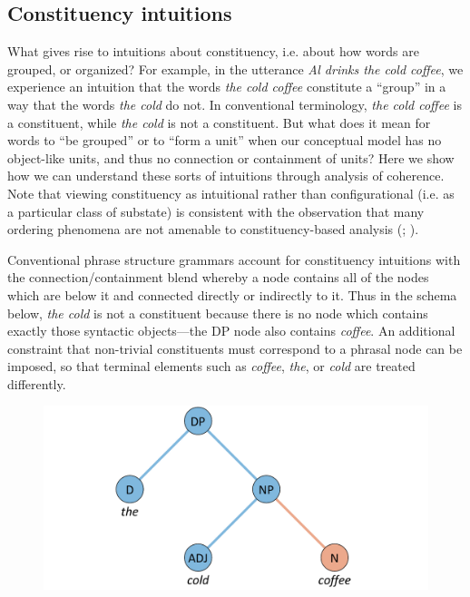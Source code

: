 \subsection{Constituency intuitions}

What gives rise to intuitions about constituency, i.e. about how words are grouped, or organized? For example, in the utterance \textit{Al drinks the cold coffee}, we experience an intuition that the words \textit{the cold coffee} constitute a “group” in a way that the words \textit{the cold} do not. In conventional terminology, \textit{the cold coffee} is a constituent, while \textit{the cold} is not a constituent. But what does it mean for words to “be grouped” or to “form a unit” when our conceptual model has no object-like units, and thus no connection or containment of units? Here we show how we can understand these sorts of intuitions through analysis of coherence. Note that viewing constituency as intuitional rather than configurational (i.e. as a particular class of substate) is consistent with the observation that many ordering phenomena are not amenable to constituency-based analysis (\citealt{Langacker1997}; \citealt{Phillips2003}).

  Conventional phrase structure grammars account for constituency intuitions with the connection/containment blend whereby a node contains all of the nodes which are below it and connected directly or indirectly to it. Thus in the schema below, \textit{the cold} is not a constituent because there is no node which contains exactly those syntactic objects—the DP node also contains \textit{coffee}. An additional constraint that non-trivial constituents must correspond to a phrasal node can be imposed, so that terminal elements such as \textit{coffee}, \textit{the}, or \textit{cold} are treated differently. 

  
\begin{figure}
\includegraphics[width=\textwidth]{figures/Tilsen-img136.png}
\caption{\missingcaption}
\label{fig:}
\end{figure}
 

